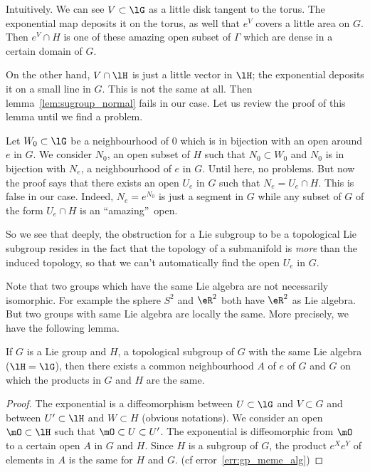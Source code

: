 Intuitively. We can see $V\subset\lG$ as a little disk tangent to  the torus. The exponential map deposits it on the torus, as well that $e^V$ covers a little area on $G$. Then $e^V\cap H$ is one of these amazing open subset of $\Gamma$ which are dense in a certain domain of $G$.

On the other hand, $V\cap\lH$ is just a little vector in $\lH$; the exponential deposits it on a small line in $G$. This is not the same at all. Then lemma~\ref{lem:sugroup_normal} fails in our case. Let us review the proof of this lemma until we find a problem.

Let $W_0\subset\lG$  be a neighbourhood of $0$ which is in bijection with an open around $e$ in $G$. We consider $N_0$, an open subset of $H$ such that $N_0\subset W_0$ and $N_0$ is in bijection with $N_e$, a neighbourhood of $e$ in $G$. Until here, no problems. But now the proof says that there exists an open $U_e$ in $G$ such that $N_e=U_e\cap H$. This is false in our case. Indeed, $N_e=e^{N_0}$ is just a segment in $G$ while any subset of $G$ of the form $U_e\cap H$ is an ``amazing''\ open.

So we see that deeply, the obstruction for a Lie subgroup to be a topological Lie subgroup resides in the fact that the topology of a submanifold is \emph{more} than the induced topology, so that we can't automatically find the open $U_e$ in $G$.


Note that two groups which have the same Lie algebra are not necessarily isomorphic. For example the sphere $S^2$ and $\eR^2$ both have $\eR^2$ as Lie algebra. But two groups with same Lie algebra are locally the same. More precisely, we have the following lemma.

\begin{lemma}
If $G$ is a Lie group and $H$, a topological subgroup of $G$ with the same Lie algebra ($\lH=\lG$), then there exists a common neighbourhood $A$ of $e$ of $G$ and $G$ on which the products in $G$ and $H$ are the same.
\end{lemma}

\begin{proof}
The exponential is a diffeomorphism between $U\subset\lG$ and $V\subset G$ and between $U'\subset\lH$ and $W\subset H$ (obvious notations). We consider an open $\mO\subset\lH$ such that $\mO\subset U\subset U'$. The exponential is diffeomorphic from $\mO$ to a certain open $A$ in $G$ and $H$. Since $H$ is a subgroup of $G$, the product $e^Xe^Y$ of elements in $A$ is the same for $H$ and $G$. (cf error~\ref{err:gp_meme_alg})
\end{proof}

